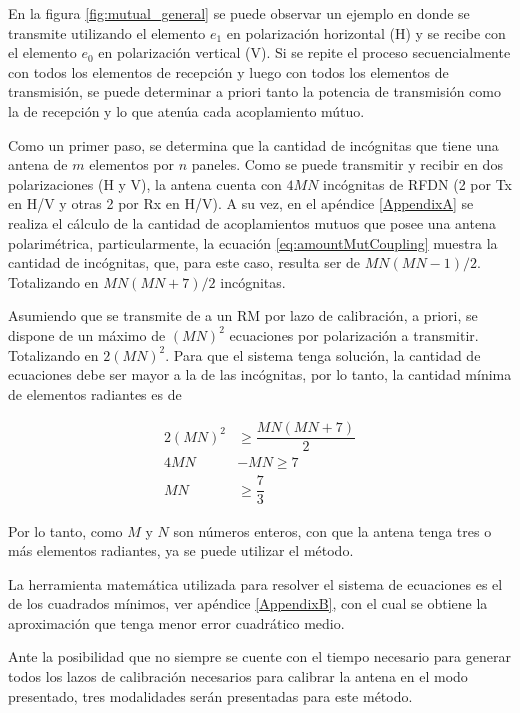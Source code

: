 En la figura \ref{fig:mutual_general} se puede observar un ejemplo en donde se transmite utilizando el elemento $e_1$ en 
polarización horizontal (H) y se recibe con el elemento $e_0$ en polarización vertical (V). Si se repite el proceso 
secuencialmente con todos los elementos de recepción y luego con todos los elementos de transmisión, se puede determinar a 
priori tanto la potencia de transmisión como la de recepción y lo que atenúa cada acoplamiento mútuo.

Como un primer paso, se determina que la cantidad de incógnitas que tiene una antena de $m$ elementos por $n$ paneles. Como 
se puede transmitir y recibir en dos polarizaciones (H y V), la antena cuenta con $4MN$ incógnitas de RFDN (2 por Tx en H/V y 
otras 2 por Rx en H/V). A su vez, en el apéndice \ref{AppendixA} se realiza el cálculo de la cantidad de acoplamientos mutuos
que posee una antena polarimétrica, particularmente, la ecuación \ref{eq:amountMutCoupling} muestra la cantidad de 
incógnitas, que, para este caso, resulta ser de $MN(MN-1)/2$. Totalizando en $MN(MN + 7)/2$ incógnitas.

Asumiendo que se transmite de a un RM por lazo de calibración, a priori, se dispone de un máximo de $(MN)^2$ ecuaciones por
polarización a transmitir. Totalizando en $2(MN)^2$. Para que el sistema tenga solución, la cantidad de ecuaciones debe ser 
mayor a la de las incógnitas, por lo tanto, la cantidad mínima de elementos radiantes es de

$$
\begin{aligned}
	2(MN)^2 &\ge  \dfrac{MN(MN + 7)}{2} \\
	4MN &- MN \ge7 \\
	MN &\ge \dfrac{7}{3}
\end{aligned}
$$

Por lo tanto, como $M$ y $N$ son números enteros, con que la antena tenga tres o más elementos radiantes, ya se puede utilizar el método.

La herramienta matemática utilizada para resolver el sistema de ecuaciones es el de los cuadrados mínimos, 
ver apéndice \ref{AppendixB}, con el cual se obtiene la aproximación que tenga menor error cuadrático medio. 

Ante la posibilidad que no siempre se cuente con el tiempo necesario para generar todos los lazos de calibración necesarios 
para calibrar la antena en el modo presentado, tres modalidades serán presentadas para este método. 

